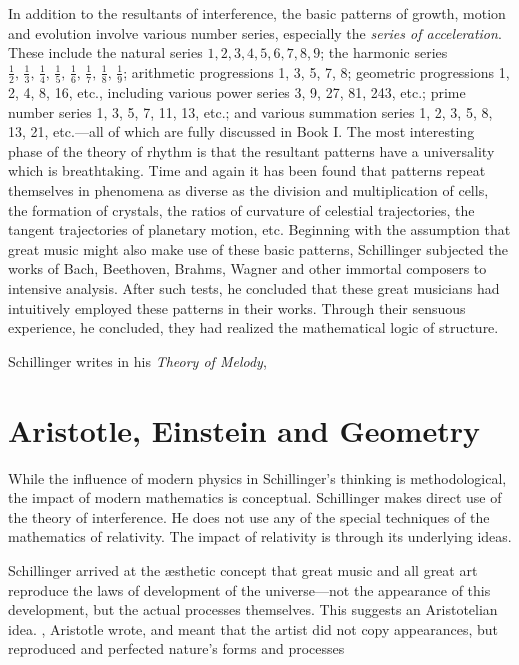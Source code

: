 In addition to the resultants of interference, the basic patterns of growth,
motion and evolution involve various number series, especially the
\textit{series of acceleration}. These include the natural series $1, 2, 3, 4,
5, 6, 7, 8, 9$; the harmonic series
$\frac{1}{2},\,\frac{1}{3},\,\frac{1}{4},\,\frac{1}{5},\,\frac{1}{6},\,\frac{1}{7},\,\frac{1}{8},\,\frac{1}{9}$;
arithmetic progressions 1, 3, 5, 7, 8; geometric progressions 1, 2, 4, 8, 16,
etc., including various power series 3, 9, 27, 81, 243, etc.; prime number
series 1, 3, 5, 7, 11, 13, etc.; and various summation series 1, 2, 3, 5, 8,
13, 21, etc.---all of which are fully discussed in Book I. The most interesting
phase of the theory of rhythm is that the resultant patterns have a
universality which is breathtaking. Time and again it has been found that
patterns repeat themselves in phenomena as diverse as the division and
multiplication of cells, the formation of crystals, the ratios of curvature of
celestial trajectories, the tangent trajectories of planetary motion, etc.
Beginning with the assumption that great music might also make use of these
basic patterns, Schillinger subjected the works of Bach, Beethoven, Brahms,
Wagner and other immortal composers to intensive analysis. After such tests, he
concluded that these great musicians had intuitively employed these patterns in
their works. Through their sensuous experience, he concluded, they had realized
the mathematical logic of structure.

 Schillinger writes in his \textit{Theory of
Melody}, 

\section{Aristotle, Einstein and Geometry}


While the influence of modern physics in Schillinger's thinking is
methodological, the impact of modern mathematics is conceptual. Schillinger
makes direct use of the theory of interference. He does not use any of the
special techniques of the mathematics of relativity. The impact of relativity
is through its underlying ideas.

Schillinger arrived at the \ae sthetic concept that great music and all great
art reproduce the laws of development of the universe---not the appearance of
this development, but the actual processes themselves. This suggests an
Aristotelian idea. \say{Art imitates nature}, Aristotle wrote, and meant that
the artist did not copy appearances, but reproduced and perfected nature's
forms and processes

